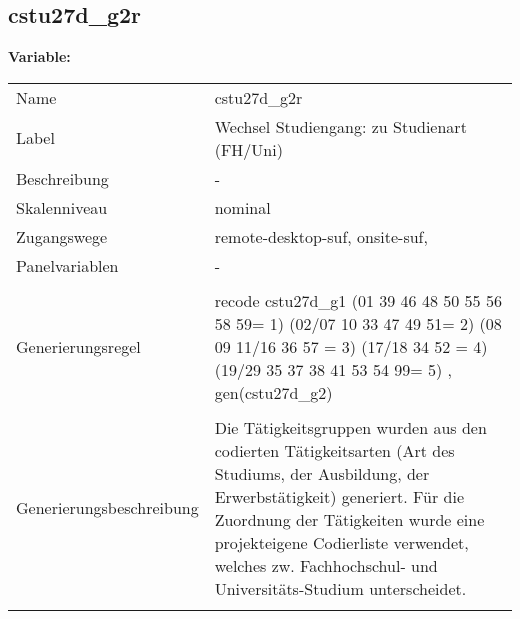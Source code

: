 	
	
	\subsection{cstu27d\_g2r}
	\label{subSection:cstu27d_g2r}

	\noindent\textbf{Variable:}\\
		\begin{tabular}{lL{11.3cm}}
			\label{tableVariable:cstu27d_g2r}
			Name & cstu27d\_g2r \\
			Label & Wechsel Studiengang: zu Studienart (FH/Uni) \\
			Beschreibung & - \\
			Skalenniveau & nominal \\
			Zugangswege &
				remote-desktop-suf,
				onsite-suf,
 \\
			Panelvariablen & -
			 \\
			 \\
					Generierungsregel & recode cstu27d\_g1  (01 39 46 48 50 55 56 58 59= 1) (02/07 10 33 47 49 51= 2) (08 09 11/16 36 57 = 3) (17/18 34 52 = 4) (19/29 35 37 38 41 53 54 99= 5) , gen(cstu27d\_g2) \\
				 \\
					Generierungsbeschreibung & Die Tätigkeitsgruppen wurden aus den codierten Tätigkeitsarten (Art des Studiums, der Ausbildung, der Erwerbstätigkeit) generiert. Für die Zuordnung der Tätigkeiten wurde eine projekteigene Codierliste verwendet, welches zw. Fachhochschul- und Universitäts-Studium unterscheidet.
				 \\	
			 \\
		\end{tabular}






